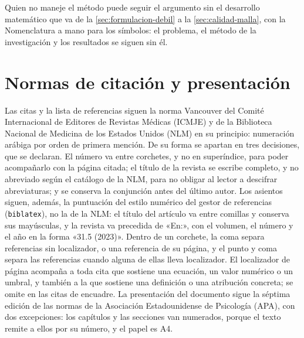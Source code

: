 Quien no maneje el método puede seguir el argumento sin el desarrollo matemático que va de la \autoref{sec:formulacion-debil} a la \autoref{sec:calidad-malla}, con la Nomenclatura a mano para los símbolos: el problema, el método de la investigación y los resultados se siguen sin él.

\section*{Normas de citación y presentación}

Las citas y la lista de referencias siguen la norma Vancouver del Comité Internacional de Editores de Revistas Médicas (ICMJE) y de la Biblioteca Nacional de Medicina de los Estados Unidos (NLM) en su principio: numeración arábiga por orden de primera mención. De su forma se apartan en tres decisiones, que se declaran. El número va entre corchetes, y no en superíndice, para poder acompañarlo con la página citada; el título de la revista se escribe completo, y no abreviado según el catálogo de la NLM, para no obligar al lector a descifrar abreviaturas; y se conserva la conjunción antes del último autor. Los asientos siguen, además, la puntuación del estilo numérico del gestor de referencias (\texttt{biblatex}), no la de la NLM: el título del artículo va entre comillas y conserva sus mayúsculas, y la revista va precedida de «En:», con el volumen, el número y el año en la forma «31.5 (2023)». Dentro de un corchete, la coma separa referencias sin localizador, o una referencia de su página, y el punto y coma separa las referencias cuando alguna de ellas lleva localizador. El localizador de página acompaña a toda cita que sostiene una ecuación, un valor numérico o un umbral, y también a la que sostiene una definición o una atribución concreta; se omite en las citas de encuadre. La presentación del documento sigue la séptima edición de las normas de la Asociación Estadounidense de Psicología (APA), con dos excepciones: los capítulos y las secciones van numerados, porque el texto remite a ellos por su número, y el papel es A4.
